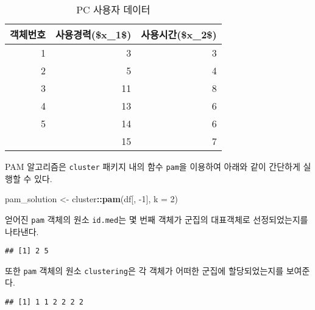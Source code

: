 \documentclass[]{book}
\newenvironment{Shaded}{\begin{snugshade}}{\end{snugshade}}
\newcommand{\DataTypeTok}[1]{\textcolor[rgb]{0.13,0.29,0.53}{#1}}
\newcommand{\DecValTok}[1]{\textcolor[rgb]{0.00,0.00,0.81}{#1}}
\newcommand{\KeywordTok}[1]{\textcolor[rgb]{0.13,0.29,0.53}{\textbf{#1}}}
\newcommand{\NormalTok}[1]{#1}
\newcommand{\OperatorTok}[1]{\textcolor[rgb]{0.81,0.36,0.00}{\textbf{#1}}}
\newcommand{\StringTok}[1]{\textcolor[rgb]{0.31,0.60,0.02}{#1}}
\begin{document}
\begin{table}[t]

\caption{\label{tab:pam-train-data}PC 사용자 데이터}
\centering
\begin{tabular}{rrr}
\toprule
객체번호 & 사용경력(\$x\_1\$) & 사용시간(\$x\_2\$)\\
\midrule
1 & 3 & 3\\
2 & 5 & 4\\
3 & 11 & 8\\
4 & 13 & 6\\
5 & 14 & 6\\
\addlinespace
6 & 15 & 7\\
\bottomrule
\end{tabular}
\end{table}

PAM 알고리즘은 \texttt{cluster} 패키지 내의 함수 \texttt{pam}을 이용하여 아래와 같이 간단하게 실행할 수 있다.

\begin{Shaded}
\begin{Highlighting}[]
\NormalTok{pam_solution <-}\StringTok{ }\NormalTok{cluster}\OperatorTok{::}\KeywordTok{pam}\NormalTok{(df[, }\DecValTok{-1}\NormalTok{], }\DataTypeTok{k =} \DecValTok{2}\NormalTok{)}
\end{Highlighting}
\end{Shaded}

얻어진 \texttt{pam} 객체의 원소 \texttt{id.med}는 몇 번째 객체가 군집의 대표객체로 선정되었는지를 나타낸다.

\begin{Shaded}
\end{Shaded}

\begin{verbatim}
## [1] 2 5
\end{verbatim}

또한 \texttt{pam} 객체의 원소 \texttt{clustering}은 각 객체가 어떠한 군집에 할당되었는지를 보여준다.

\begin{Shaded}
\end{Shaded}

\begin{verbatim}
## [1] 1 1 2 2 2 2
\end{verbatim}
\end{document}
